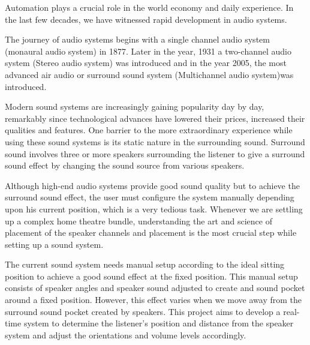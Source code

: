 \documentclass[../../../patent_v1.tex]{subfiles}
\begin{document}
Automation plays a crucial role in the world economy and daily experience. 
In the last few decades, we have witnessed rapid development in audio systems.

The journey of audio systems begins with a single channel audio system (monaural 
audio system) in 1877. Later in the year, 1931 a two-channel audio system (Stereo 
audio system) was introduced and in the year 2005, the most advanced air audio or
surround sound system (Multichannel audio system)was introduced.

Modern sound systems are increasingly gaining popularity day by day, remarkably since 
technological advances have lowered their prices, increased their qualities and 
features. One barrier to the more extraordinary experience while using these sound 
systems is its static nature in the surrounding sound. Surround sound involves three 
or more speakers surrounding the listener to give a surround sound effect by changing 
the sound source from various speakers.

Although high-end audio systems provide good sound quality but to achieve the surround 
sound effect, the user must configure the system manually depending upon his current 
position, which is a very tedious task. Whenever we are settling up a complex home 
theatre bundle, understanding the art and science of placement of the speaker channels 
and placement is the most crucial step while setting up a sound system.

The current sound system needs manual setup according to the ideal sitting position to 
achieve a good sound effect at the fixed position. This manual setup consists of speaker 
angles and speaker sound adjusted to create and sound pocket around a fixed position. 
However, this effect varies when we move away from the surround sound pocket created by 
speakers. This project aims to develop a real-time system to determine the listener’s 
position and distance from the speaker system and adjust the orientations and volume 
levels accordingly. 
\end{document}
